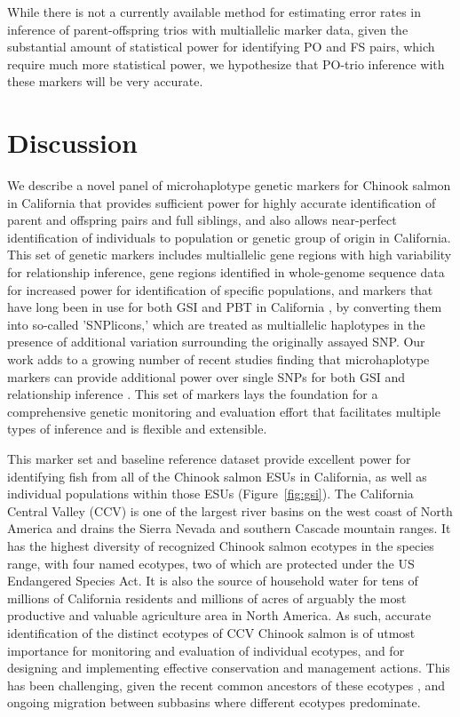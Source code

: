 While there is not a currently available method \citep[like that of][]{anderson2006power} for estimating error rates in
inference of parent-offspring trios with multiallelic marker data, given the substantial amount of statistical power for identifying
PO and FS pairs, which 
require much more statistical power, we hypothesize that PO-trio inference with these markers will be very accurate.








\section*{Discussion}

We describe a novel panel of microhaplotype genetic markers for Chinook salmon
in California that provides sufficient power for highly accurate identification 
of parent and offspring pairs and full siblings, and also allows near-perfect
identification of individuals to population or genetic group of origin in California. 
This set of genetic markers includes multiallelic gene regions with high variability for
relationship inference, gene regions identified in whole-genome sequence data
for increased power for identification of specific populations, and markers that have
long been in use for both GSI and PBT in California \citep{clemento2014evaluation}, by converting them
into so-called 'SNPlicons,' which are treated as multiallelic haplotypes in the presence
of additional variation surrounding the originally assayed SNP\@. Our work adds to a growing
number of recent studies finding that microhaplotype markers can provide additional
power over single SNPs for both GSI \citep{mckinney2017managing,mckinney2022new,hargrove2024efficient} and
relationship inference \citep{baetscher2018microhaplotypes,bootsma2020gt,delomas2024microhaplotypes}.
This set of markers lays the foundation for a comprehensive 
genetic monitoring and evaluation effort that facilitates multiple types of inference 
and is flexible and extensible.


This marker set and baseline reference dataset provide
excellent power for identifying fish from all of the Chinook salmon ESUs in California,
as well as individual populations within those ESUs (Figure~\ref{fig:gsi}).
The California Central Valley (CCV) is one of the largest river
basins on the west coast of North America and drains the Sierra Nevada and southern Cascade
mountain ranges. It has the highest diversity of recognized Chinook salmon
ecotypes in the species range, with four named ecotypes, two of which are protected
under the US Endangered Species Act. It is also the source of household water for
tens of millions of California residents and millions of acres of arguably
the most productive and valuable agriculture area in North America. As such, accurate identification of the distinct 
ecotypes of CCV Chinook salmon is of utmost importance for monitoring and
evaluation of individual ecotypes, and for designing and implementing
effective conservation and management actions. This has been challenging,
given the recent common ancestors of these ecotypes \citep{clemento2014evaluation}, and
ongoing migration between subbasins where different ecotypes predominate.


